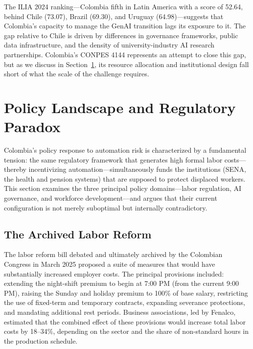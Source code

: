 The ILIA 2024 \cite{ilia2024} ranking---Colombia fifth in Latin America with a score of 52.64, behind Chile (73.07), Brazil (69.30), and Uruguay (64.98)---suggests that Colombia's capacity to manage the GenAI transition lags its exposure to it. The gap relative to Chile is driven by differences in governance frameworks, public data infrastructure, and the density of university-industry AI research partnerships. Colombia's CONPES 4144 \cite{conpes4144} represents an attempt to close this gap, but as we discuss in Section~\ref{sec:policy}, its resource allocation and institutional design fall short of what the scale of the challenge requires.


\section{Policy Landscape and Regulatory Paradox}
\label{sec:policy}

Colombia's policy response to automation risk is characterized by a fundamental tension: the same regulatory framework that generates high formal labor costs---thereby incentivizing automation---simultaneously funds the institutions (SENA, the health and pension systems) that are supposed to protect displaced workers. This section examines the three principal policy domains---labor regulation, AI governance, and workforce development---and argues that their current configuration is not merely suboptimal but internally contradictory.

\subsection{The Archived Labor Reform}
\label{subsec:labor_reform}

The labor reform bill debated and ultimately archived by the Colombian Congress in March 2025 proposed a suite of measures that would have substantially increased employer costs. The principal provisions included: extending the night-shift premium to begin at 7:00 PM (from the current 9:00 PM), raising the Sunday and holiday premium to 100\% of base salary, restricting the use of fixed-term and temporary contracts, expanding severance protections, and mandating additional rest periods. Business associations, led by Fenalco, estimated that the combined effect of these provisions would increase total labor costs by 18--34\%, depending on the sector and the share of non-standard hours in the production schedule.

